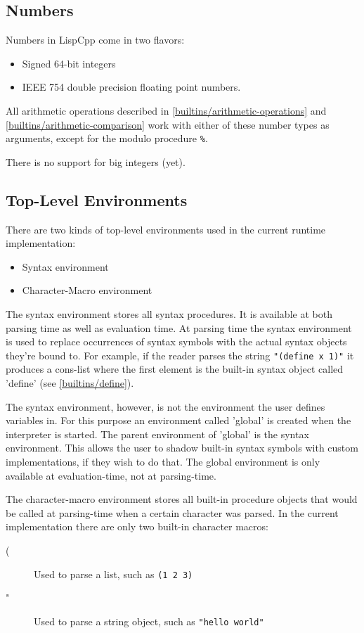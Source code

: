 \documentclass[a4paper]{scrartcl}
\begin{document}
\subsection{Numbers}
\label{numbers}
	Numbers in LispCpp come in two flavors:
	\begin{itemize}
		\item Signed 64-bit integers
		\item IEEE 754 double precision floating point numbers.
	\end{itemize}

	All arithmetic operations described in \ref{builtins/arithmetic-operations} and \ref{builtins/arithmetic-comparison} work with either of these number types as arguments, except for the modulo procedure \lstinline|%|.

	There is no support for big integers (yet).

\subsection{Top-Level Environments}
\label{env}
	There are two kinds of top-level environments used in the current runtime implementation:
	\begin{itemize}
		\item Syntax environment
		\item Character-Macro environment
	\end{itemize}

	The syntax environment stores all syntax procedures. It is available at both parsing time as well as evaluation time. At parsing time the syntax environment is used to replace occurrences of syntax symbols with the actual syntax objects they're bound to. For example, if the reader parses the string \lstinline|"(define x 1)"| it produces a cons-list where the first element is the built-in syntax object called 'define' (see \ref{builtins/define}).

	The syntax environment, however, is not the environment the user defines variables in. For this purpose an environment called 'global' is created when the interpreter is started. The parent environment of 'global' is the syntax environment. This allows the user to shadow built-in syntax symbols with custom implementations, if they wish to do that. The global environment is only available at evaluation-time, not at parsing-time.

	The character-macro environment stores all built-in procedure objects that would be called at parsing-time when a certain character was parsed. In the current implementation there are only two built-in character macros:
	\begin{description}
		\item[(] Used to parse a list, such as \lstinline|(1 2 3)|
		\item["] Used to parse a string object, such as \lstinline|"hello world"|
	\end{description}
\end{document}
